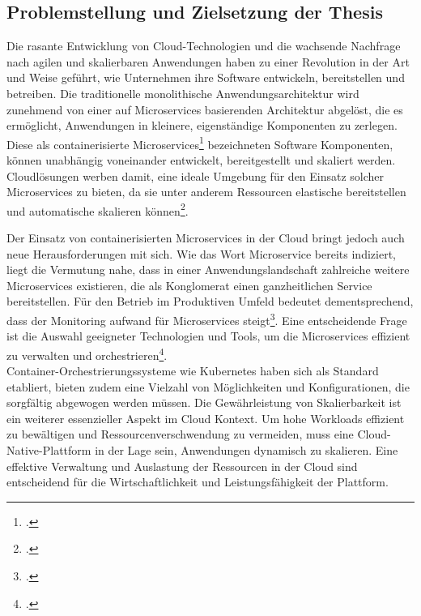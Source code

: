 \subsection{Problemstellung und Zielsetzung der Thesis}
Die rasante Entwicklung von Cloud-Technologien und die wachsende Nachfrage nach agilen und skalierbaren Anwendungen haben zu einer Revolution in der Art und Weise geführt, wie Unternehmen ihre Software entwickeln, bereitstellen und betreiben. Die traditionelle monolithische Anwendungsarchitektur wird zunehmend von einer auf Microservices basierenden Architektur abgelöst, die es ermöglicht, Anwendungen in kleinere, eigenständige Komponenten zu zerlegen. Diese als containerisierte Microservices\footcite[Vgl.][S.4]{wolff2018microservices} bezeichneten Software Komponenten, können unabhängig voneinander entwickelt, bereitgestellt und skaliert werden. Cloudlösungen werben damit, eine ideale Umgebung für den Einsatz solcher Microservices zu bieten, da sie unter anderem Ressourcen elastische bereitstellen und automatische skalieren können\footcite[Vgl.][S.8--19]{henneberger2016cloud}.

Der Einsatz von containerisierten Microservices in der Cloud bringt jedoch auch neue Herausforderungen mit sich. Wie das Wort Microservice bereits indiziert, liegt die Vermutung nahe, dass in einer Anwendungslandschaft zahlreiche weitere Microservices existieren, die als Konglomerat einen ganzheitlichen Service bereitstellen. Für den Betrieb im Produktiven Umfeld bedeutet dementsprechend, dass der Monitoring aufwand für Microservices steigt\footcite[Vgl.][S. 12--13]{wolff2018microservices}. Eine entscheidende Frage ist die Auswahl geeigneter Technologien und Tools, um die Microservices effizient zu verwalten und orchestrieren\footcite[Vgl.][S. 16]{wolff2018microservices}. \\
Container-Orchestrierungssysteme wie Kubernetes haben sich als Standard etabliert, bieten zudem eine Vielzahl von Möglichkeiten und Konfigurationen, die sorgfältig abgewogen werden müssen. Die Gewährleistung von Skalierbarkeit ist ein weiterer essenzieller Aspekt im Cloud Kontext.  Um hohe Workloads effizient zu bewältigen und Ressourcenverschwendung zu vermeiden, muss eine Cloud-Native-Plattform in der Lage sein, Anwendungen dynamisch zu skalieren. Eine effektive Verwaltung und Auslastung der Ressourcen in der Cloud sind entscheidend für die Wirtschaftlichkeit und Leistungsfähigkeit der Plattform.


